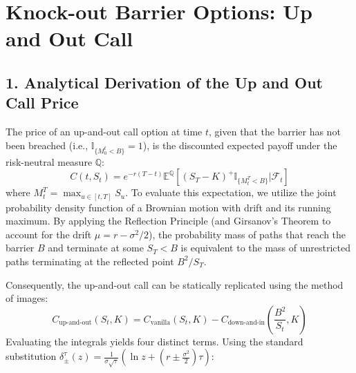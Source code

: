 \section*{Knock-out Barrier Options: Up and Out Call}

\subsection*{1. Analytical Derivation of the Up and Out Call Price}

The price of an up-and-out call option at time $t$, given that the barrier has not been breached (i.e., $\mathbb{I}_{\{M_0^t < B\}} = 1$), is the discounted expected payoff under the risk-neutral measure $\mathbb{Q}$:
\begin{equation}
    C(t, S_t) = e^{-r(T-t)} \mathbb{E}^{\mathbb{Q}}\left[ (S_T - K)^+ \mathbb{I}_{\{M_t^T < B\}} \Big| \mathcal{F}_t \right]
\end{equation}
where $M_t^T = \max_{u \in [t, T]} S_u$. To evaluate this expectation, we utilize the joint probability density function of a Brownian motion with drift and its running maximum. By applying the Reflection Principle (and Girsanov's Theorem to account for the drift $\mu = r - \sigma^2/2$), the probability mass of paths that reach the barrier $B$ and terminate at some $S_T < B$ is equivalent to the mass of unrestricted paths terminating at the reflected point $B^2/S_T$.

Consequently, the up-and-out call can be statically replicated using the method of images:
\begin{equation}
    C_{\text{up-and-out}}(S_t, K) = C_{\text{vanilla}}(S_t, K) - C_{\text{down-and-in}}\left(\frac{B^2}{S_t}, K\right)
\end{equation}
Evaluating the integrals yields four distinct terms. Using the standard substitution $\delta_{\pm}^{\tau}(z) = \frac{1}{\sigma\sqrt{\tau}}\left(\ln z + \left(r \pm \frac{\sigma^2}{2}\right)\tau\right)$:


